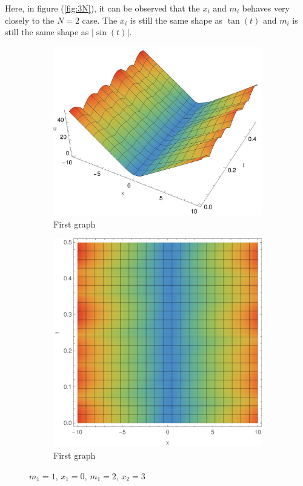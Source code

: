 \documentclass[english,master]{liumaiex}
\theoremstyle{plain}
\theoremstyle{definition}
\begin{document}
Here, in figure (\ref{fig:3N}), it can be observed that the $x_i$ and $m_i$ behaves very closely to the $N = 2$ case. The $x_i$ is still the same shape as $\tan(t)$ and $m_i$ is still the same shape as $|\sin(t)|$.

\begin{figure}[H]
	\begin{subfigure}{0.44\textwidth}
		\includegraphics[width=\textwidth]{graphs/3NInfinite/u3D.pdf}
        \caption{First graph}
    \end{subfigure}
	\hfill
	\begin{subfigure}{0.44\textwidth}
		\includegraphics[width=\textwidth]{graphs/3NInfinite/u2D.pdf}
        \caption{First graph}
    \end{subfigure}
    \caption{$m_1 = 1$, $x_1 = 0$, $m_1 = 2$, $x_2 = 3$}
	\label{fig:u3N}
\end{figure}
\end{document}
